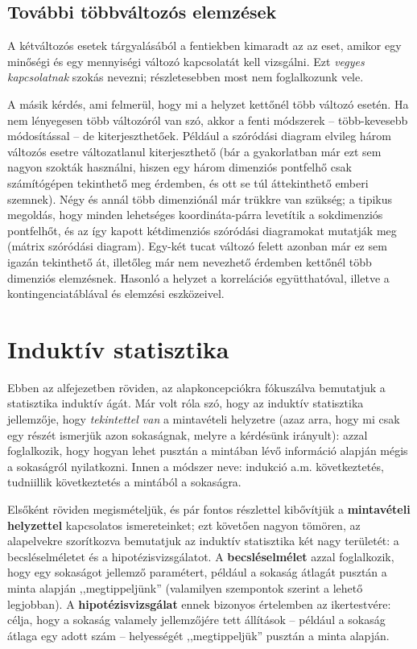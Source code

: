 \documentclass[
]{book}
\begin{document}
\hypertarget{deskriptivtovabbitobbvalt}{%
\section{További többváltozós elemzések}\label{deskriptivtovabbitobbvalt}}

A kétváltozós esetek tárgyalásából a fentiekben kimaradt az az eset, amikor egy minőségi és egy mennyiségi változó kapcsolatát kell vizsgálni. Ezt \emph{vegyes kapcsolatnak} szokás nevezni; részletesebben most nem foglalkozunk vele.

A másik kérdés, ami felmerül, hogy mi a helyzet kettőnél több változó esetén. Ha nem lényegesen több változóról van szó, akkor a fenti módszerek -- több-kevesebb módosítással -- de kiterjeszthetőek. Például a szóródási diagram elvileg három változós esetre változatlanul kiterjeszthető (bár a gyakorlatban már ezt sem nagyon szokták használni, hiszen egy három dimenziós pontfelhő csak számítógépen tekinthető meg érdemben, és ott se túl áttekinthető emberi szemnek). Négy és annál több dimenziónál már trükkre van szükség; a tipikus megoldás, hogy minden lehetséges koordináta-párra levetítik a sokdimenziós pontfelhőt, és az így kapott kétdimenziós szóródási diagramokat mutatják meg (mátrix szóródási diagram). Egy-két tucat változó felett azonban már ez sem igazán tekinthető át, illetőleg már nem nevezhető érdemben kettőnél több dimenziós elemzésnek. Hasonló a helyzet a korrelációs együtthatóval, illetve a kontingenciatáblával és elemzési eszközeivel.

\hypertarget{induktiv}{%
\chapter{Induktív statisztika}\label{induktiv}}

Ebben az alfejezetben röviden, az alapkoncepciókra fókuszálva bemutatjuk a statisztika induktív ágát. Már volt róla szó, hogy az induktív statisztika jellemzője, hogy \emph{tekintettel van} a mintavételi helyzetre (azaz arra, hogy mi csak egy részét ismerjük azon sokaságnak, melyre a kérdésünk irányult): azzal foglalkozik, hogy hogyan lehet pusztán a mintában lévő információ alapján mégis a sokaságról nyilatkozni. Innen a módszer neve: indukció a.m. következtetés, tudniillik következtetés a mintából a sokaságra.

Elsőként röviden megismételjük, és pár fontos részlettel kibővítjük a \textbf{mintavételi helyzettel} kapcsolatos ismereteinket; ezt követően nagyon tömören, az alapelvekre szorítkozva bemutatjuk az induktív statisztika két nagy területét: a becsléselméletet és a hipotézisvizsgálatot. A \textbf{becsléselmélet} azzal foglalkozik, hogy egy sokaságot jellemző paramétert, például a sokaság átlagát pusztán a minta alapján ,,megtippeljünk'' (valamilyen szempontok szerint a lehető legjobban). A \textbf{hipotézisvizsgálat} ennek bizonyos értelemben az ikertestvére: célja, hogy a sokaság valamely jellemzőjére tett állítások -- például a sokaság átlaga egy adott szám -- helyességét ,,megtippeljük'' pusztán a minta alapján.
\end{document}
